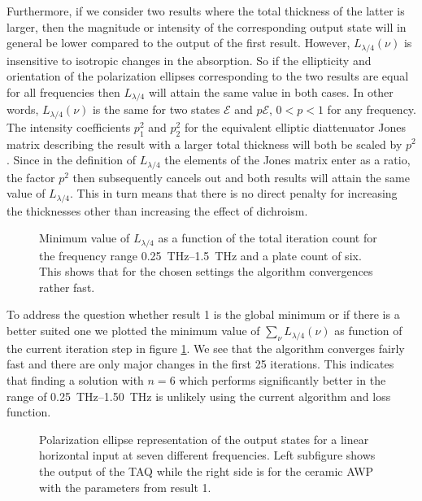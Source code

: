 Furthermore, if we consider two results where the total thickness of the latter is larger, then the magnitude or intensity of the corresponding output state will in general be lower compared to the output of the first result. However, $L_{\lambda/4}(\nu)$ is insensitive to isotropic changes in the absorption. So if the ellipticity and orientation of the polarization ellipses corresponding to the two results are equal for all frequencies then $L_{\lambda/4}$ will attain the same value in both cases. In other words, $L_{\lambda/4}(\nu)$ is the same for two states $\bm{\mathcal{E}}$ and $p\bm{\mathcal{E}}$, $0<p<1$ for any frequency. The intensity coefficients $p_1^2$ and $p_2^2$ for the equivalent elliptic diattenuator Jones matrix describing the result with a larger total thickness will both be scaled by $p^2$. Since in the definition of $L_{\lambda/4}$ the elements of the Jones matrix enter as a ratio, the factor $p^2$ then subsequently cancels out and both results will attain the same value of $L_{\lambda/4}$. This in turn means that there is no direct penalty for increasing the thicknesses other than increasing the effect of dichroism. 

\begin{figure}[H]
    \centering
    
    \caption{Minimum value of $L_{\lambda/4}$ as a function of the total iteration count for the frequency range \SIrange{0.25}{1.5}{\tera \hertz} and a plate count of six. This shows that for the chosen settings the algorithm convergences rather fast.}
    \label{fig:cl4_convergence}
\end{figure}

To address the question whether result 1 is the global minimum or if there is a better suited one we plotted the minimum value of $\sum_{\nu}L_{\lambda/4}(\nu)$ as function of the current iteration step in figure  \ref{fig:cl4_convergence}. We see that the algorithm converges fairly fast and there are only major changes in the first 25 iterations. This indicates that finding a solution with $n=6$ which performs significantly better in the range of \SIrange{0.25}{1.50}{\tera \hertz} is unlikely using the current algorithm and loss function.

\begin{figure}[H]
    \centering
    
    \caption{Polarization ellipse representation of the output states for a linear horizontal input at seven different frequencies. Left subfigure shows the output of the TAQ while the right side is for the ceramic AWP with the parameters from result 1.}
    \label{fig:cl4_pe_lp}
\end{figure}

